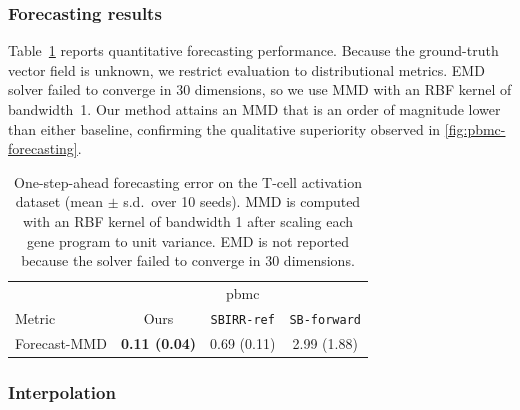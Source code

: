 \subsubsection{Forecasting results}
\label{app:pbmc-forecast}
Table~\ref{tab:repr-pbmc} reports quantitative forecasting performance.  
Because the ground-truth vector field is unknown, we restrict evaluation to distributional metrics.  
EMD solver failed to converge in 30 dimensions, so we use MMD with an RBF kernel of bandwidth~1.  
Our method attains an MMD that is an order of magnitude lower than either baseline, confirming the qualitative superiority observed in \cref{fig:pbmc-forecasting}.  

\begin{table}[!ht]
    \centering
    \caption{One-step-ahead forecasting error on the T-cell activation dataset (mean $\pm$ s.d.\ over 10 seeds). MMD is computed with an RBF kernel of bandwidth 1 after scaling each gene program to unit variance. EMD is not reported because the solver failed to converge in 30 dimensions.}
    \begin{tabular}{lccc}
    \hline
    &     & pbmc & \\
    Metric     &  Ours & \texttt{SBIRR-ref} & \texttt{SB-forward} \\
    \hline
    Forecast-MMD & \cellcolor{green!25}\textbf{0.11 (0.04)} & 0.69 (0.11)& 2.99 (1.88) \\
    \hline
    \end{tabular}

    \label{tab:repr-pbmc}
\end{table}

\subsubsection{Interpolation}
\label{app:pbmc-interpol}

